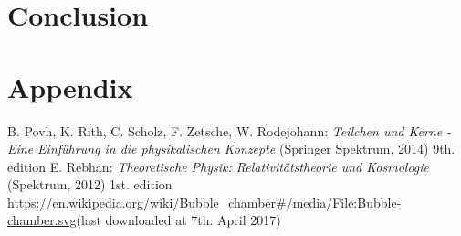 \documentclass[10pt, a4paper, notitlepage, DIV=15]{scrartcl}
\begin{document}
\section{Conclusion}

\section{Appendix}

\begin{thebibliography}{}
	B. Povh, K. Rith, C. Scholz, F. Zetsche, W. Rodejohann: \textit{Teilchen und Kerne - Eine Einführung in die physikalischen Konzepte} (Springer Spektrum, 2014) 9th. edition
	E. Rebhan: \textit{Theoretische Physik: Relativitätstheorie und Kosmologie} (Spektrum, 2012) 1st. edition
	\url{https://en.wikipedia.org/wiki/Bubble_chamber#/media/File:Bubble-chamber.svg}\newline (last downloaded at 7th. April 2017)
\end{thebibliography}
 
\end{document}
